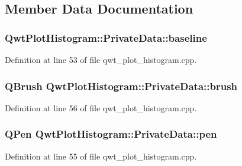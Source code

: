 \subsection{Member Data Documentation}
\hypertarget{class_qwt_plot_histogram_1_1_private_data_af35e199fd6aa5ac860b6d555404251ac}{
\subsubsection[{baseline}]{ Qwt\-Plot\-Histogram\-::\-Private\-Data\-::baseline}}\label{class_qwt_plot_histogram_1_1_private_data_af35e199fd6aa5ac860b6d555404251ac}


Definition at line 53 of file qwt\-\_\-plot\-\_\-histogram.\-cpp.

\hypertarget{class_qwt_plot_histogram_1_1_private_data_a60144f46627708c2d71560801589913e}{
\subsubsection[{brush}]{\setlength{\rightskip}{0pt plus 5cm}Q\-Brush Qwt\-Plot\-Histogram\-::\-Private\-Data\-::brush}}\label{class_qwt_plot_histogram_1_1_private_data_a60144f46627708c2d71560801589913e}


Definition at line 56 of file qwt\-\_\-plot\-\_\-histogram.\-cpp.

\hypertarget{class_qwt_plot_histogram_1_1_private_data_a813b2a778b95099851f8771eed23e3ca}{
\subsubsection[{pen}]{\setlength{\rightskip}{0pt plus 5cm}Q\-Pen Qwt\-Plot\-Histogram\-::\-Private\-Data\-::pen}}\label{class_qwt_plot_histogram_1_1_private_data_a813b2a778b95099851f8771eed23e3ca}


Definition at line 55 of file qwt\-\_\-plot\-\_\-histogram.\-cpp.

